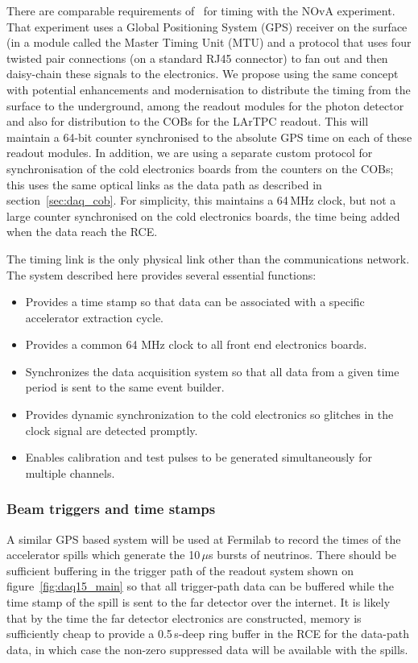 There are comparable requirements of \LBNE\ for timing with the NOvA
experiment.  That experiment uses a Global Positioning System (GPS)
receiver on the surface (in a module called the Master Timing Unit
(MTU) and a protocol that uses four twisted pair connections (on a
standard RJ45 connector) to fan out and then daisy-chain these signals
to the electronics.  We propose using the same concept with potential
enhancements and modernisation to distribute the timing from the
surface to the underground, among the readout modules for the photon
detector and also for distribution to the COBs for the LArTPC readout.
This will maintain a 64-bit counter synchronised to the absolute GPS
time on each of these readout modules.  In addition, we are using a
separate custom protocol for synchronisation of the cold electronics
boards from the counters on the COBs; this uses the same optical links
as the data path as described in section~\ref{sec:daq_cob}.  For
simplicity, this maintains a 64\,MHz clock, but not a large counter
synchronised on the cold electronics boards, the time being added when
the data reach the RCE.

The timing link is the only physical link other than the
communications network.  The system described here
provides several essential functions:
\begin{itemize}
\item Provides a time stamp so that data can be associated with a
  specific accelerator extraction cycle.
\item Provides a common 64 MHz clock to all front end electronics
  boards.
\item Synchronizes the data acquisition system so that all data from a
  given time period is sent to the same event builder.
\item Provides dynamic synchronization to the cold electronics so
  glitches in the clock signal are detected promptly.
\item Enables calibration and test pulses to be generated
  simultaneously for multiple channels.
\end{itemize}

\subsubsection{Beam triggers and time stamps}

A similar GPS based system will be used at Fermilab to record the times
of the accelerator spills which generate the 10\,$\mu$s bursts of
neutrinos.  There should be sufficient buffering in the trigger path
of the readout system shown on figure~\ref{fig:daq15_main} so that all
trigger-path data can be buffered while the time stamp of the spill is
sent to the far detector over the internet.  It is likely  that by
the time the far detector electronics are constructed, memory is
sufficiently cheap to provide a 0.5\,s-deep ring buffer in the RCE for
the data-path data, in which case the non-zero suppressed data will be
available with the spills.

